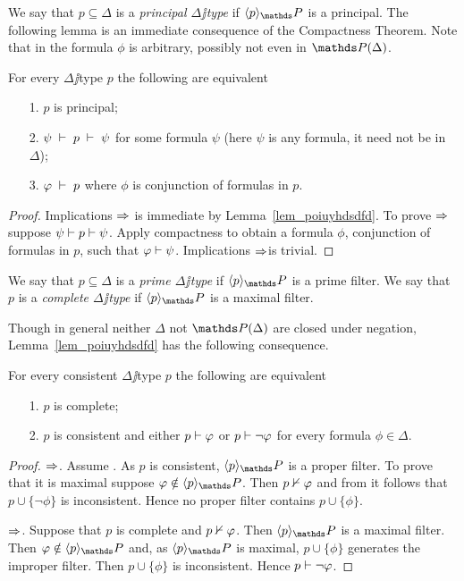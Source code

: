 \documentclass[creche.tex]{subfiles}
\begin{document}
We say that $p\subseteq\Delta$ is a \emph{principal $\Delta\jj$type\/} if $\<p\>_\PP$ is a principal. The following lemma is an immediate consequence of the Compactness Theorem. Note that in  the formula $\phi$ is arbitrary, possibly not even in $\PP(\Delta)$. 

\begin{lemma}
For every $\Delta\jj$type $p$ the following are equivalent
\begin{itemize}
\item[1.] $p$ is principal;
\item[2.] $\psi \;\vdash\; p \;\vdash\; \psi$ for some formula $\psi$ (here $\psi$ is any formula, it need not be in $\Delta$);
\item[3.] $\varphi \;\vdash\; p$ where $\phi$ is conjunction of formulas in $p$.\QED 
\end{itemize}
\end{lemma}

\begin{proof}
Implications $\Rightarrow$ is immediate by Lemma~\ref{lem_poiuyhdsdfd}. To prove $\Rightarrow$ suppose $\psi\vdash p\vdash\psi$. Apply compactness to obtain a formula $\phi$, conjunction of formulas in $p$, such that $\varphi\vdash\psi$. Implications $\Rightarrow$is trivial.
\end{proof}

\begin{definition}
We say that $p\subseteq\Delta$ is a \emph{prime $\Delta\jj$type\/} if $\<p\>_\PP$ is a  prime filter. We say that $p$ is a \emph{complete $\Delta\jj$type\/} if $\<p\>_\PP$ is a maximal filter.\QED
\end{definition}

Though in general neither $\Delta$ not $\PP(\Delta)$ are closed under negation, Lemma~\ref{lem_poiuyhdsdfd} has the following consequence.

\begin{proposition}\label{prop_test_completezza}
For every consistent $\Delta\jj$type $p$ the following are equivalent
\begin{itemize}
\item[1.] $p$ is complete;
\item[2.] $p$ is consistent and either $p\vdash\varphi$ or $p\vdash\neg\varphi$ for every formula $\phi\in\Delta$.
\end{itemize}
\end{proposition}
\begin{proof}
$\Rightarrow$. Assume . As $p$ is consistent, $\<p\>_\PP$ is a proper filter. To prove that it is maximal suppose $\phi\notin\<p\>_\PP$. Then $p\nvdash\varphi$ and from  it follows that  $p\cup\{\neg\phi\}$ is inconsistent. Hence no proper filter contains $p\cup\{\phi\}$.

$\Rightarrow$. Suppose that $p$ is complete and $p\nvdash\varphi$. Then $\<p\>_\PP$ is a maximal filter. Then $\phi\notin\<p\>_\PP$ and, as $\<p\>_\PP$ is maximal, $p\cup\{\phi\}$ generates the improper filter. Then $p\cup\{\phi\}$ is inconsistent. Hence $p\vdash\neg\varphi$. 
\end{proof}
\end{document}
